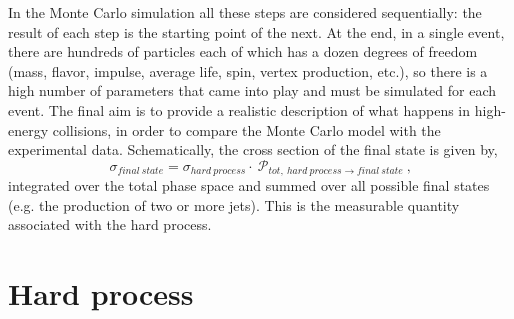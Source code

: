 In the  Monte Carlo simulation  all these steps are considered sequentially: the result of each step is the starting point of the next.
At the end, in a single event, there are hundreds of particles each of which has a dozen degrees of freedom (mass, flavor, impulse, average life, spin, vertex production, etc.), so there is a  high number of parameters that came into play and must be simulated for each event.
The final aim is to provide a realistic description of what happens in high-energy collisions, in order to compare the Monte Carlo model with the experimental data.
Schematically, the cross section of the final state is given by,
\begin{equation}
 \sigma_{final \: state}=\sigma_{hard \: process} \cdot \: \mathcal{P}_{tot, \:hard \: process \rightarrow final \:state} \: \mbox{,}\end{equation}
integrated over the total phase space and summed over all possible final states (e.g. the production of two or more jets). This is the measurable quantity associated with the hard process. \\




\section{Hard process}


